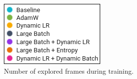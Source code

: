 \documentclass[10pt,conference]{IEEEtran}
\begin{document}
\begin{figure}[htbp]
  \centering
  \begin{minipage}[b]{\textwidth}
    \centering
  \end{minipage}
  \hfill
  \begin{minipage}[b]{\textwidth}
    \centering
    \includegraphics{figs/legend.png}
    \caption{Number of explored frames during training.}
    \label{fig:frames}
  \end{minipage}
\end{figure}
\end{document}
